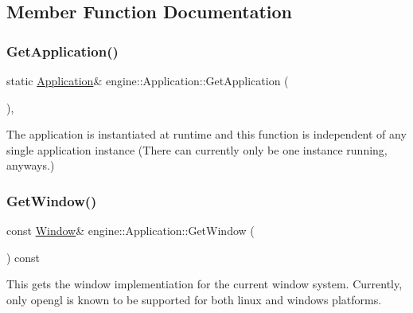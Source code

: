 \subsection{Member Function Documentation}
\mbox{\label{classengine_1_1Application_a639cdab87d3c5a14d0a9e9203d6c7c97}} 
\subsubsection{\texorpdfstring{Get\+Application()}{GetApplication()}}
{\footnotesize\ttfamily static \hyperlink{classengine_1_1Application}{Application}\& engine\+::\+Application\+::\+Get\+Application (\begin{DoxyParamCaption}{ }\end{DoxyParamCaption})\hspace{0.3cm}{\ttfamily [inline]}, {\ttfamily [static]}}

The application is instantiated at runtime and this function is independent of any single application instance (There can currently only be one instance running, anyways.) \mbox{\label{classengine_1_1Application_a0c66a3ff294bcc497bb2e8eb7330124c}} 
\subsubsection{\texorpdfstring{Get\+Window()}{GetWindow()}}
{\footnotesize\ttfamily const \hyperlink{classengine_1_1Window}{Window}\& engine\+::\+Application\+::\+Get\+Window (\begin{DoxyParamCaption}{ }\end{DoxyParamCaption}) const\hspace{0.3cm}{\ttfamily [inline]}}

This gets the window implementiation for the current window system. Currently, only opengl is known to be supported for both linux and windows platforms. \mbox{\label{classengine_1_1Application_a093e14152fc1eda1b5eba682a2b4afd9}} 
